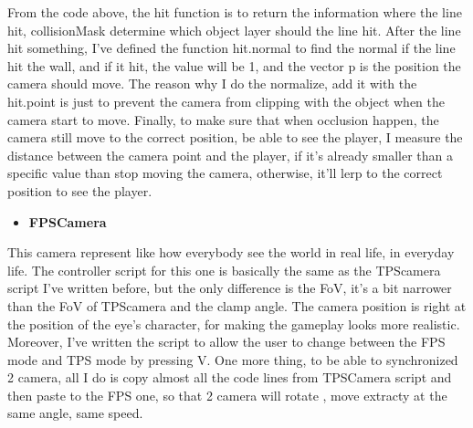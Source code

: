 \documentclass[a4paper, 13pt]{extarticle}
\begin{document}
From the code above, the hit function is to return the information where the line hit, collisionMask determine which object layer should the line hit. After the line hit something, I've defined the function hit.normal to find the normal if the line hit the wall, and if it hit, the value will be 1, and the vector p is the position the camera should move. The reason why I do the normalize, add it with the hit.point is just to prevent the camera from clipping with the object when the camera start to move. Finally, to make sure that when occlusion happen, the camera still move to the correct position, be able to see the player, I measure the distance between the camera point and the player, if it's already smaller than a specific value than stop moving the camera, otherwise, it'll lerp to the correct position to see the player.  
\begin{itemize}
	\item \bfseries FPSCamera 	 	
\end{itemize}
	This camera represent like how everybody see the world in real life, in everyday life. The controller script for this one is basically the same as the TPScamera script I've written before, but the only difference is the FoV, it's a bit narrower than the FoV of TPScamera and the clamp angle. The camera position is right at the position of the eye's character, for making the gameplay looks more realistic. Moreover, I've written the script to allow the user to change between the FPS mode and TPS mode by pressing V. One more thing, to be able to synchronized 2 camera, all I do is copy almost all the code lines from TPSCamera script and then paste to the FPS one, so that 2 camera will rotate , move extracty at the same angle, same speed. 
\end{document}
